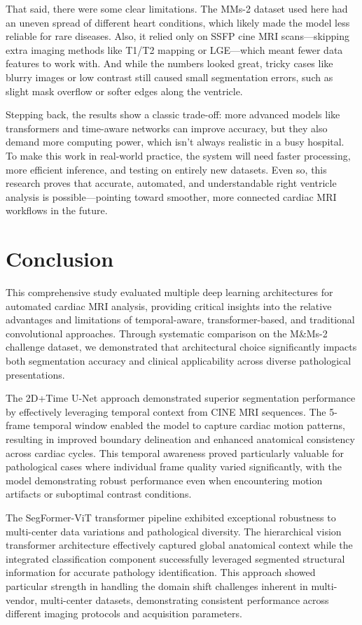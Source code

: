 \documentclass[twoside,11pt]{article}
\begin{document}
    That said, there were some clear limitations. The MMs-2 dataset used here had an uneven spread of different heart conditions, which likely made the model less reliable for rare diseases. Also, it relied only on SSFP cine MRI scans—skipping extra imaging methods like T1/T2 mapping or LGE—which meant fewer data features to work with. And while the numbers looked great, tricky cases like blurry images or low contrast still caused small segmentation errors, such as slight mask overflow or softer edges along the ventricle.
    
    Stepping back, the results show a classic trade-off: more advanced models like transformers and time-aware networks can improve accuracy, but they also demand more computing power, which isn’t always realistic in a busy hospital. To make this work in real-world practice, the system will need faster processing, more efficient inference, and testing on entirely new datasets. Even so, this research proves that accurate, automated, and understandable right ventricle analysis is possible—pointing toward smoother, more connected cardiac MRI workflows in the future.

  \section{Conclusion}
  
  This comprehensive study evaluated multiple deep learning architectures for automated cardiac MRI analysis, providing critical insights into the relative advantages and limitations of temporal-aware, transformer-based, and traditional convolutional approaches. Through systematic comparison on the M\&Ms-2 challenge dataset, we demonstrated that architectural choice significantly impacts both segmentation accuracy and clinical applicability across diverse pathological presentations.
  
  The 2D+Time U-Net approach demonstrated superior segmentation performance by effectively leveraging temporal context from CINE MRI sequences. The 5-frame temporal window enabled the model to capture cardiac motion patterns, resulting in improved boundary delineation and enhanced anatomical consistency across cardiac cycles. This temporal awareness proved particularly valuable for pathological cases where individual frame quality varied significantly, with the model demonstrating robust performance even when encountering motion artifacts or suboptimal contrast conditions.
  
  The SegFormer-ViT transformer pipeline exhibited exceptional robustness to multi-center data variations and pathological diversity. The hierarchical vision transformer architecture effectively captured global anatomical context while the integrated classification component successfully leveraged segmented structural information for accurate pathology identification. This approach showed particular strength in handling the domain shift challenges inherent in multi-vendor, multi-center datasets, demonstrating consistent performance across different imaging protocols and acquisition parameters.
  
\end{document}
